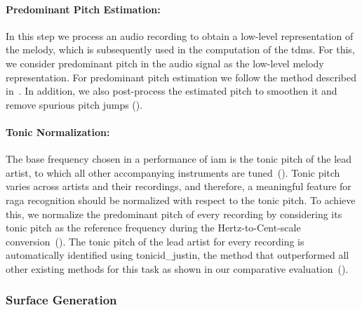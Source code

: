 \paragraph{Predominant Pitch Estimation:} In this step we process an audio recording to obtain a low-level representation of the melody, which is subsequently used in the computation of the \gls{tdms}. For this, we consider predominant pitch in the audio signal as the low-level melody representation. For predominant pitch estimation we follow the method described in~. In addition, we also post-process the estimated pitch to smoothen it and remove spurious pitch jumps (). 

\paragraph{Tonic Normalization:} The base frequency chosen in a performance of \gls{iam} is the tonic pitch of the lead artist, to which all other accompanying instruments are tuned~(). 
Tonic pitch varies across artists and their recordings, and therefore, a meaningful feature for \gls{raga} recognition should be normalized with respect to the tonic pitch. To achieve this, we normalize the predominant pitch of every recording by considering its tonic pitch as the reference frequency during the Hertz-to-Cent-scale conversion~(). The tonic pitch of the lead artist for every recording is automatically identified using \acrshort{tonicid_justin}, the method that outperformed all other existing methods for this task as shown in our comparative evaluation~(). 

\subsubsection{Surface Generation}
\label{sec:tdms_surface_generation}

